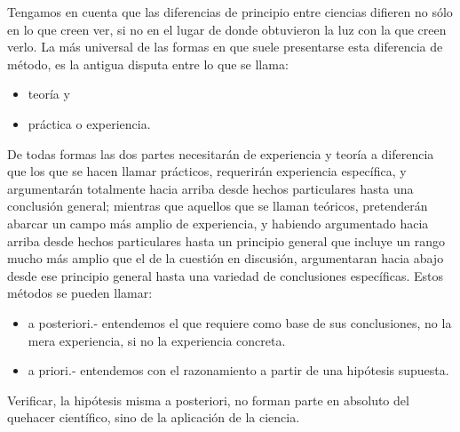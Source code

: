 Tengamos en cuenta que las diferencias de principio entre ciencias difieren no sólo en lo que creen ver, si no en el lugar de donde obtuvieron la luz con la que creen verlo. La más universal de las formas en que suele presentarse esta diferencia de método, es la antigua disputa entre lo que se llama:

\begin{itemize}
\item teoría y
\item práctica o experiencia. 
\end{itemize}

De todas formas las dos partes necesitarán de experiencia y teoría a diferencia que los que se hacen llamar prácticos, requerirán experiencia específica, y argumentarán totalmente hacia arriba desde hechos particulares hasta una conclusión general; mientras que aquellos que se llaman teóricos, pretenderán abarcar un campo más amplio de experiencia, y habiendo argumentado hacia arriba desde hechos particulares hasta un principio general que incluye un rango mucho más amplio que el de la cuestión en discusión, argumentaran hacia abajo desde ese principio general hasta una variedad de conclusiones específicas. Estos métodos  se pueden llamar: 
\begin{itemize}
    \item a posteriori.- entendemos el que requiere como base de sus conclusiones, no la mera experiencia, si no la experiencia concreta.
    \item a priori.- entendemos con el razonamiento a partir de una hipótesis supuesta.
\end{itemize}
Verificar, la hipótesis misma a posteriori, no forman parte en absoluto del quehacer científico, sino de la aplicación de la ciencia.\\

